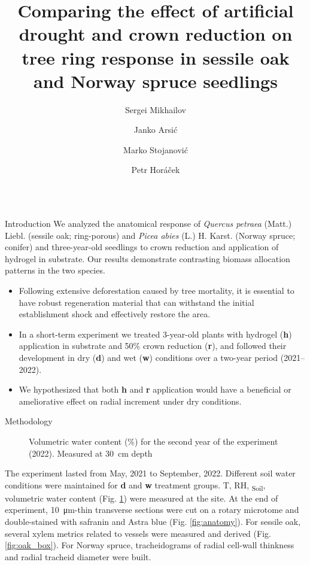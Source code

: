 \documentclass[final]{beamer}
\title{Comparing the effect of artificial drought and crown reduction on tree ring response in sessile oak and Norway spruce seedlings}
\author{Sergei Mikhailov \inst{1-3} \and Janko Arsić \inst{1-2} \and Marko Stojanović \inst{2} \and Petr Horáček \inst{1-2}}
\institute[MendelU]{\inst{1} Mendel University in Brno, CZ \samelineand \inst{2} Global Change Research Institute CAS, CZ \\ \inst{3} Komarov Botanical Institute RAS, RU}
\newlength{\sepwidth}
\newlength{\colwidth}
\newcommand{\separatorcolumn}{\begin{column}{\sepwidth}\end{column}}
\begin{document}
\begin{frame}[t]
\begin{columns}[t]


\begin{column}{\colwidth}

\begin{alertblock}{Introduction}
    We analyzed the anatomical response of \textit{Quercus petraea} (Matt.) Liebl. (sessile oak; ring-porous) and \textit{Picea abies} (L.) H. Karst. (Norway spruce; conifer) and three-year-old seedlings to crown reduction and application of hydrogel in substrate. Our results demonstrate contrasting biomass allocation patterns in the two species.
    \small
    \begin{itemize}
        \item Following extensive deforestation caused by tree mortality, it is essential to have robust regeneration material that can withstand the initial establishment shock and effectively restore the area.
        \item In a short-term experiment we treated 3-year-old plants with hydrogel (\textbf{h}) application in substrate and 50\% crown reduction (\textbf{r}), and followed their development in dry (\textbf{d}) and wet (\textbf{w}) conditions over a two-year period (2021--2022).
        \item We hypothesized that both \textbf{h} and \textbf{r} application would have a beneficial or ameliorative effect on radial increment under dry conditions.
    \end{itemize}
\end{alertblock}

\begin{block}{Methodology}
    \begin{minipage}[t]{0.45\textwidth}
        \begin{figure}
            
            \caption{Volumetric water content (\%) for the second year of the experiment (2022). Measured at \SI{30}{\centi\meter} depth}
            \label{fig:vwc}
        \end{figure}
    \end{minipage}\hfill
    \begin{minipage}[t]{0.45\textwidth}
        The experiment lasted from May, 2021 to September, 2022.
        Different soil water conditions were maintained for \textbf{d} and \textbf{w} treatment groups.
        T, RH, \Psi\textsubscript{Soil}, volumetric water content (Fig. \ref{fig:vwc}) were measured at the site.
        At the end of experiment, \SI{10}{\micro\meter}-thin transverse sections were cut on a rotary microtome and double-stained with safranin and Astra blue (Fig. \ref{fig:anatomy}).
        For sessile oak, several xylem metrics related to vessels were measured and derived (Fig. \ref{fig:oak_box}).
        For Norway spruce, tracheidograms of radial cell-wall thinkness and radial tracheid diameter were built.


\end{minipage}
\end{block}
\end{column}
\end{columns}
\end{frame}
\end{document}
